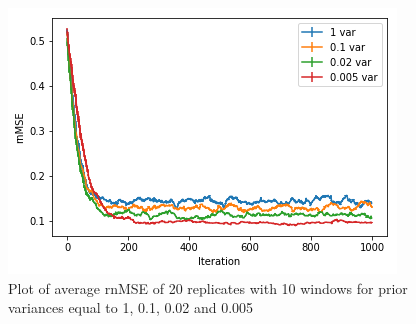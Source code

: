 \begin{figure}[hbt!]
\caption{Plot of average rnMSE of 20 replicates with 10 windows for prior variances equal to 1, 0.1, 0.02 and 0.005}
\label{fig:prior_variance}
    \centering
    \includegraphics[scale=0.6]{fig/Prior_variance_plot.png}
\end{figure}


\cleardoublepage